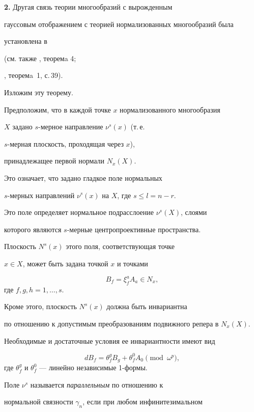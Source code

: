 {\bf 2.} Другая связь теории многообразий с вырожденным


гауссовым отображением с теорией нормализованных многообразий была


установлена в \cite{Cha77}


(см. также \cite{Cha78}, теоремa 4;


\cite{Cha90}, теоремa~1, с.\,39).


Изложим эту теорему.



Предположим, что в каждой точке $x$ нормализованного многообразия


$X$ задано $s$-мерное направление $\nu^s (x)$ (т.\,е.


$s$-мерная плоскость, проходящая через $x$),


принадлежащее первой нормали $N_x (X)$.


 Это означает, что задано гладкое поле нормальных


$s$-мерных направлений $\nu^s (x)$ на $X$, где $s \leq l = n - r$.


 Это поле определяет нормальное подрасслоение $\nu^s (X)$, слоями


которого являются $s$-мерные центропроективные пространства.



 Плоскость $N^s (x)$ этого поля, соответствующая точке


$x \in X$, может быть задана точкой $x$ и точками


\begin{equation}\label{eq:55}
B_f = \xi_f^a A_a \in N_x,
\end{equation}
где $f, g, h = 1, \dotsc, s$.



Кроме этого, плоскость $N^s (x)$ должна быть инвариантна


по отношению к допустимым преобразованиям подвижного репера в $N_x (X)$.


Необходимые и достаточные условия ее инвариантности имеют вид


$$


dB_f = \theta_f^g B_g + \theta_f^0 A_0 \pmod{\omega^p},


$$
где $\theta_f^g$ и $\theta_f^0$ --- линейно независимые 1-формы.



Поле $\nu^s$ называется {\it параллельным} по отношению к


нормальной связности $\gamma_n$, если при любом инфинитезимальном


